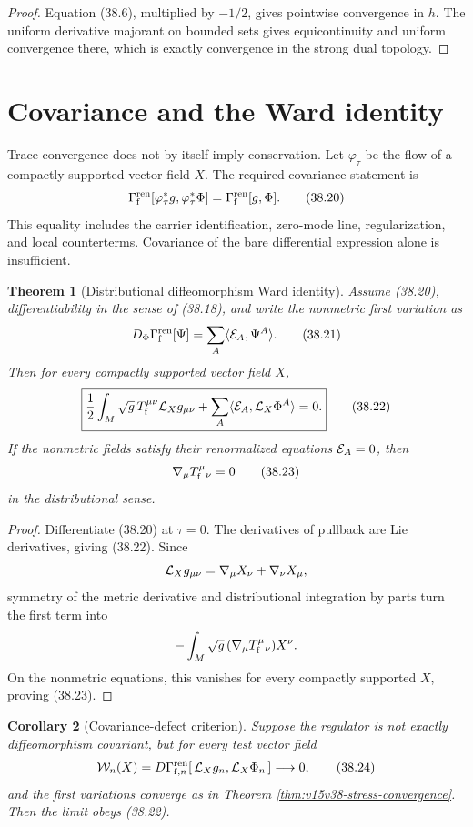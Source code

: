 \documentclass[11pt]{article}
\newtheorem{theorem}{Theorem}[section]
\newtheorem{corollary}[theorem]{Corollary}
\theoremstyle{remark}
\begin{document}
\begin{proof}
Equation (38.6), multiplied by \(-1/2\), gives pointwise
convergence in \(h\).  The uniform derivative majorant on bounded
sets gives equicontinuity and uniform convergence there, which is
exactly convergence in the strong dual topology.
\end{proof}

\section{Covariance and the Ward identity}

Trace convergence does not by itself imply conservation.  Let
\(\varphi_\tau\) be the flow of a compactly supported vector field
\(X\).  The required covariance statement is
\[
 \Gamma_{\rm f}^{\rm ren}
 [\varphi_\tau^*g,\varphi_\tau^*\Phi]
 =
 \Gamma_{\rm f}^{\rm ren}[g,\Phi].                       \tag{38.20}
\]
This equality includes the carrier identification, zero-mode line,
regularization, and local counterterms.  Covariance of the bare
differential expression alone is insufficient.

\begin{theorem}[Distributional diffeomorphism Ward identity]
\label{thm:v15v38-ward}
Assume (38.20), differentiability in the sense of (38.18), and
write the nonmetric first variation as
\[
 D_\Phi\Gamma_{\rm f}^{\rm ren}[\Psi]
 =\sum_A\langle{\cal E}_A,\Psi^A\rangle.                 \tag{38.21}
\]
Then for every compactly supported vector field \(X\),
\[
 \boxed{
 \frac12\int_M\sqrt g\,T_{\rm f}^{\mu\nu}
              {\cal L}_Xg_{\mu\nu}
 +\sum_A\langle{\cal E}_A,{\cal L}_X\Phi^A\rangle=0.}    \tag{38.22}
\]
If the nonmetric fields satisfy their renormalized equations
\({\cal E}_A=0\), then
\[
 \nabla_\mu T_{\rm f}^{\mu}{}_\nu=0                     \tag{38.23}
\]
in the distributional sense.
\end{theorem}

\begin{proof}
Differentiate (38.20) at \(\tau=0\).  The derivatives of pullback
are Lie derivatives, giving (38.22).  Since
\[
 {\cal L}_Xg_{\mu\nu}=\nabla_\mu X_\nu+\nabla_\nu X_\mu,
\]
symmetry of the metric derivative and distributional integration by
parts turn the first term into
\[
 -\int_M\sqrt g\,(\nabla_\mu T_{\rm f}^{\mu}{}_\nu)X^\nu.
\]
On the nonmetric equations, this vanishes for every compactly
supported \(X\), proving (38.23).
\end{proof}

\begin{corollary}[Covariance-defect criterion]
\label{cor:v15v38-covariance-defect}
Suppose the regulator is not exactly diffeomorphism covariant, but
for every test vector field
\[
 {\cal W}_n(X)=
 D\Gamma_{{\rm f},n}^{\rm ren}
 [\,{\cal L}_Xg_n,{\cal L}_X\Phi_n\,]
 \longrightarrow0,                                     \tag{38.24}
\]
and the first variations converge as in Theorem
\ref{thm:v15v38-stress-convergence}.  Then the limit obeys
(38.22).
\end{corollary}
\end{document}
